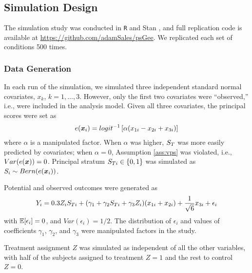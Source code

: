 \documentclass[]{article}
\begin{document}
\subsection{Simulation Design}
The simulation study was conducted in \texttt{R} \citep{rcite} and Stan \citep{rstan}, and full replication code is available at %
\url{https://github.com/adamSales/psGee}.
We replicated each set of conditions 500 times.

\subsubsection{Data Generation}\label{sec:dataGeneration}

In each run of the simulation, we simulated three independent standard normal covariates, $x_k$, $k=1,\dots,3$. However, only the first two covariates were ``observed,'' i.e., were included in the analysis model.
Given all three covariates, the principal scores were set as
\begin{equation*}
  e(\bm{x}_i)=logit^{-1}\left[\alpha(x_{1i}-x_{2i}+x_{3i})\right]
\end{equation*}
where $\alpha$ is a manipulated factor.
When $\alpha$ was higher, $S_T$ was more easily predicted by covariates; when $\alpha=0$, Assumption \ref{ass:vps} was violated, i.e., $Var(e(\bm{x}))=0$.
Principal stratum $S_{Ti}\in \{0,1\}$ was simulated as $S_i\sim Bern(e(\bm{x}_i))$.

\label{potential}Potential and observed outcomes were generated as
\begin{equation}\label{eq:y-sim}
Y_i=0.3 Z_i\sti+(\gamma_1+\gamma_2\sti+\gamma_3Z_i)(x_{1i}+x_{2i})+\frac{1}{\sqrt{6}}x_{3i}+\epsilon_i%
\end{equation}
with %
$\mathbb{E}[\epsilon_i]=0$, and $Var(\epsilon_i)=1/2$.
The distribution of $\epsilon_i$ and values of coefficients $\gamma_1$, $\gamma_2$, and $\gamma_3$ were manipulated factors in the study.

Treatment assignment $Z$ was simulated as independent of all the other variables, with half of the subjects assigned to treatment $Z=1$ and the rest to control $Z=0$.
\end{document}
